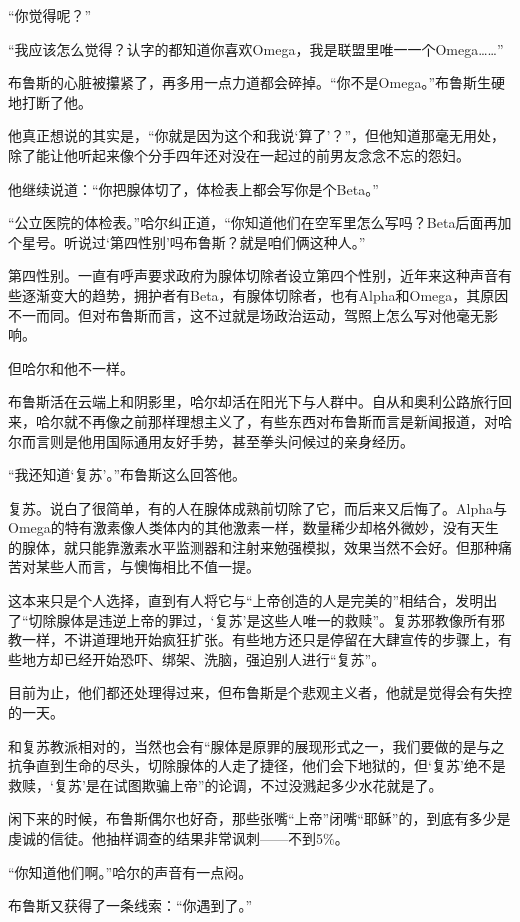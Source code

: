 \documentclass[../main]{subfiles}
\begin{document}
“你觉得呢？”

“我应该怎么觉得？认字的都知道你喜欢Omega，我是联盟里唯一一个Omega……”

布鲁斯的心脏被攥紧了，再多用一点力道都会碎掉。“你不是Omega。”布鲁斯生硬地打断了他。

他真正想说的其实是，“你就是因为这个和我说‘算了’？”，但他知道那毫无用处，除了能让他听起来像个分手四年还对没在一起过的前男友念念不忘的怨妇。

他继续说道：“你把腺体切了，体检表上都会写你是个Beta。”

“公立医院的体检表。”哈尔纠正道，“你知道他们在空军里怎么写吗？Beta后面再加个星号。听说过‘第四性别’吗布鲁斯？就是咱们俩这种人。”

第四性别。一直有呼声要求政府为腺体切除者设立第四个性别，近年来这种声音有些逐渐变大的趋势，拥护者有Beta，有腺体切除者，也有Alpha和Omega，其原因不一而同。但对布鲁斯而言，这不过就是场政治运动，驾照上怎么写对他毫无影响。

但哈尔和他不一样。

布鲁斯活在云端上和阴影里，哈尔却活在阳光下与人群中。自从和奥利公路旅行回来，哈尔就不再像之前那样理想主义了，有些东西对布鲁斯而言是新闻报道，对哈尔而言则是他用国际通用友好手势，甚至拳头问候过的亲身经历。

“我还知道‘复苏’。”布鲁斯这么回答他。

复苏。说白了很简单，有的人在腺体成熟前切除了它，而后来又后悔了。Alpha与Omega的特有激素像人类体内的其他激素一样，数量稀少却格外微妙，没有天生的腺体，就只能靠激素水平监测器和注射来勉强模拟，效果当然不会好。但那种痛苦对某些人而言，与懊悔相比不值一提。

这本来只是个人选择，直到有人将它与“上帝创造的人是完美的”相结合，发明出了“切除腺体是违逆上帝的罪过，‘复苏’是这些人唯一的救赎”。复苏邪教像所有邪教一样，不讲道理地开始疯狂扩张。有些地方还只是停留在大肆宣传的步骤上，有些地方却已经开始恐吓、绑架、洗脑，强迫别人进行“复苏”。

目前为止，他们都还处理得过来，但布鲁斯是个悲观主义者，他就是觉得会有失控的一天。

和复苏教派相对的，当然也会有“腺体是原罪的展现形式之一，我们要做的是与之抗争直到生命的尽头，切除腺体的人走了捷径，他们会下地狱的，但‘复苏’绝不是救赎，‘复苏’是在试图欺骗上帝”的论调，不过没溅起多少水花就是了。

闲下来的时候，布鲁斯偶尔也好奇，那些张嘴“上帝”闭嘴“耶稣”的，到底有多少是虔诚的信徒。他抽样调查的结果非常讽刺——不到5\%。

“你知道他们啊。”哈尔的声音有一点闷。

布鲁斯又获得了一条线索：“你遇到了。”
\end{document}
